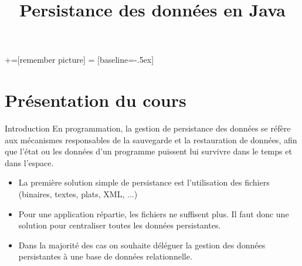 \documentclass[xcolor=pdftex,x11names,table]{beamer}
\title[Persistance des données]{Persistance des données en Java}
\date{}
\begin{document}

  +=[remember picture]
   = [baseline=-.5ex]

  \begin{frame}
  \titlepage
  \end{frame}
  \section{Présentation du cours}
    \begin{frame}{Introduction}
      En programmation, la gestion de persistance des données se réfère aux mécanismes 
      responsables de la sauvegarde et la restauration de données, afin que l'état ou les données 
      d'un programme puissent lui survivre dans le temps et dans l'espace.
      \pause 
      \begin{itemize}[<+->]
      	\item La première solution simple de persistance est l'utilisation des fichiers (binaires, textes, plats, XML, ...)
      	\item Pour une application répartie, les fichiers ne suffisent plus. 
      	  Il faut donc une solution pour centraliser toutes les données persistantes.
      	\item Dans la majorité des cas on souhaite déléguer la gestion des données 
      	  persistantes à une base de données relationnelle.
      \end{itemize}
    \end{frame}
    
\end{document}
